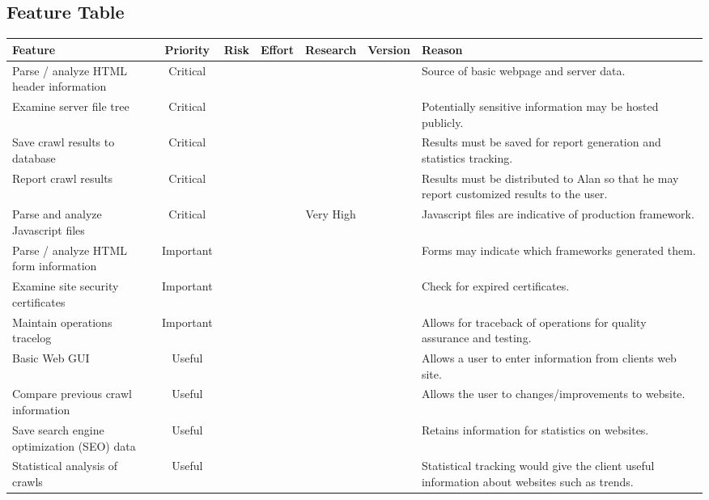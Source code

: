 \subsection{Feature Table}
\begin{tabularx}{\textwidth}{|X|c|c|c|c|c|X|}
	\hline
	\bf Feature &\bf Priority &\bf Risk &\bf Effort &\bf Research &\bf Version &\bf Reason \\ \hline
	Parse / analyze HTML header information & Critical & \lw & \md & \md &  & Source of basic webpage and server data. \\ \hline
	Examine server file tree & Critical & \md & \lw & \lw & & Potentially sensitive information may be hosted publicly. \\ \hline
	Save crawl results to database & Critical & \md & \hh & \lw & & Results must be saved for report generation and statistics tracking. \\ \hline
	Report crawl results & Critical & \hh & \md & \md & & Results must be distributed to Alan so that he may report customized results to the user. \\ \hline
	Parse and analyze Javascript files & Critical & \lw & \hh & Very High & & Javascript files are indicative of production framework. \\ \hline
	Parse / analyze HTML form information & Important & \lw & \hh & \hh &  & Forms may indicate which frameworks generated them. \\ \hline
	Examine site security certificates & Important & \md & \lw & \md & & Check for expired certificates. \\ \hline
	Maintain operations tracelog & Important & \hh & \lw & \lw & & Allows for traceback of operations for quality assurance and testing. \\ \hline
	Basic Web GUI & Useful & \lw & \lw & \lw & & Allows a user to enter information from clients web site. \\ \hline
	Compare previous crawl information & Useful & \lw & \hh & \md & & Allows the user to changes/improvements to website. \\ \hline
	Save search engine optimization (SEO) data & Useful & \lw & \lw & \md & & Retains information for statistics on websites. \\ \hline
	Statistical analysis of crawls & Useful & \md & \hh & \md & & Statistical tracking would give the client useful information about websites such as trends. \\ \hline
\end{tabularx}
\newpage